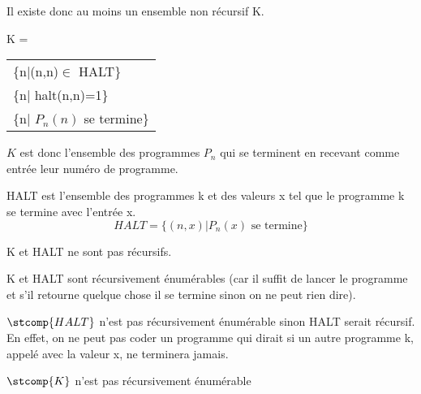 Il existe donc au moins un ensemble non récursif
K.

\begin{mydef}[K]
	K =
	\begin{tabular}{l}
		\{n|(n,n)$\in$ HALT\}\\
		\{n| halt(n,n)=1\}\\
		\{n| $P_n(n)$ se termine\}
	\end{tabular}

	$K$ est donc l'ensemble des programmes $P_n$ qui se terminent en recevant comme entrée leur numéro de programme.
\end{mydef}

\begin{mydef}[HALT]
	HALT est l'ensemble des programmes k et des valeurs x tel que le programme k se termine avec l'entrée x.
	\[ HALT = \{(n,x)|P_n(x)\text{ se termine}\}\]
\end{mydef}

\begin{myprop}
	K et HALT ne sont pas récursifs.
\end{myprop}

\begin{myprop}
	K et HALT sont récursivement énumérables (car il suffit de lancer le programme et s’il retourne quelque chose il se termine sinon on ne peut rien dire).
\end{myprop}

\begin{myprop}
	$\stcomp{HALT}$ n'est pas récursivement énumérable sinon HALT serait récursif.  En effet, on ne peut pas coder un programme qui dirait si un autre programme k, appelé avec la valeur x, ne terminera jamais.
\end{myprop}

\begin{myprop}
	$\stcomp{K}$ n'est pas récursivement énumérable
\end{myprop}

